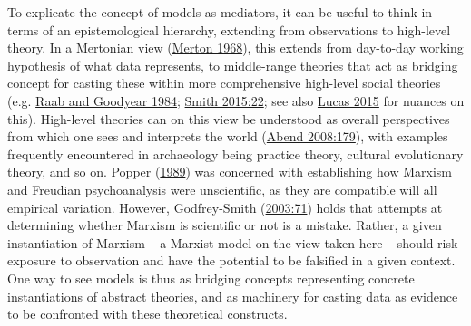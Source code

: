 \documentclass[
  12pt,
  a4paper,
  oneside]{book}
\begin{document}
To explicate the concept of models as mediators, it can be useful to think in terms of an epistemological hierarchy, extending from observations to high-level theory. In a Mertonian view (\protect\hyperlink{ref-merton1968}{Merton 1968}), this extends from day-to-day working hypothesis of what data represents, to middle-range theories that act as bridging concept for casting these within more comprehensive high-level social theories (e.g. \protect\hyperlink{ref-raab1984}{Raab and Goodyear 1984}; \protect\hyperlink{ref-smith2015}{Smith 2015:22}; see also \protect\hyperlink{ref-lucas2015}{Lucas 2015} for nuances on this). High-level theories can on this view be understood as \textquotesingle overall perspectives from which one sees and interprets the world\textquotesingle{} (\protect\hyperlink{ref-abend2008}{Abend 2008:179}), with examples frequently encountered in archaeology being practice theory, cultural evolutionary theory, and so on. Popper (\protect\hyperlink{ref-popper1989}{1989}) was concerned with establishing how Marxism and Freudian psychoanalysis were unscientific, as they are compatible will all empirical variation. However, Godfrey-Smith (\protect\hyperlink{ref-godfrey-smith2003}{2003:71}) holds that attempts at determining whether Marxism is scientific or not is a mistake. Rather, a given instantiation of Marxism -- a Marxist model on the view taken here -- should risk exposure to observation and have the potential to be falsified in a given context. One way to see models is thus as bridging concepts representing concrete instantiations of abstract theories, and as machinery for casting data as evidence to be confronted with these theoretical constructs.
\end{document}
